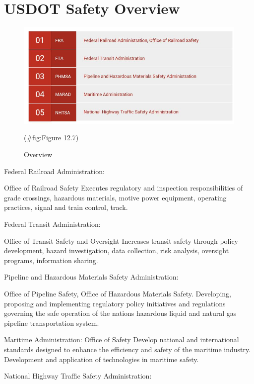 \documentclass[
]{book}
\begin{document}
\hypertarget{organization-overview}{%
\section{USDOT Safety Overview}\label{organization-overview}}

\begin{figure}

{\centering \includegraphics{./Images/Research organizations/Overview} 

}

\caption{Overview}(\#fig:Figure 12.7)
\end{figure}

Federal Railroad Administration:

Office of Railroad Safety
Executes regulatory and inspection responsibilities of grade crossings, hazardous materials, motive power equipment, operating practices, signal and train control, track.

Federal Transit Administration:

Office of Transit Safety and Oversight
Increases transit safety through policy development, hazard investigation, data collection, risk analysis, oversight programs, information sharing.

Pipeline and Hazardous Materials Safety Administration:

Office of Pipeline Safety, Office of Hazardous Materials Safety.
Developing, proposing and implementing regulatory policy initiatives and regulations governing the safe operation of the nations hazardous liquid and natural gas pipeline transportation system.

Maritime Administration:
Office of Safety
Develop national and international standards designed to enhance the efficiency and safety of the maritime industry.
Development and application of technologies in maritime safety.

National Highway Traffic Safety Administration:
\end{document}
